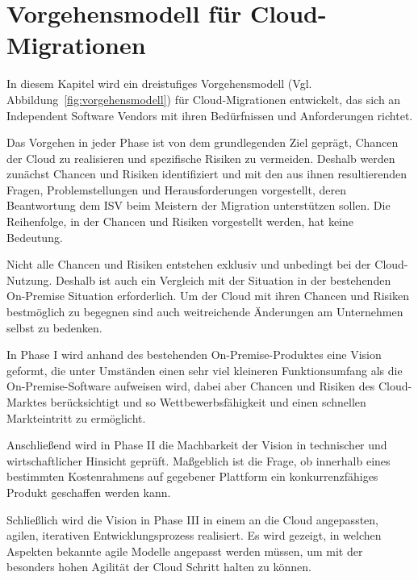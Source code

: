 \section{Vorgehensmodell für Cloud-Migrationen}
\label{cha:entwicklung_vorgehensmodell}
In diesem Kapitel wird ein dreistufiges Vorgehensmodell (Vgl. 
Abbildung~\ref{fig:vorgehensmodell}) für Cloud-Migrationen entwickelt, das sich 
an Independent Software Vendors mit ihren Bedürfnissen und Anforderungen 
richtet.

Das Vorgehen in jeder Phase ist von dem grundlegenden Ziel geprägt, Chancen der 
Cloud zu realisieren und spezifische Risiken zu vermeiden. Deshalb werden 
zunächst Chancen und Risiken identifiziert und mit den aus ihnen resultierenden 
Fragen, Problemstellungen und Herausforderungen vorgestellt, deren 
Beantwortung dem ISV beim Meistern der Migration unterstützen sollen. Die 
Reihenfolge, in der Chancen und Risiken vorgestellt werden, hat keine 
Bedeutung. 

Nicht alle Chancen und Risiken entstehen exklusiv und unbedingt 
bei der Cloud-Nutzung. Deshalb ist auch ein Vergleich mit der Situation in der 
bestehenden On-Premise Situation erforderlich. Um der Cloud mit ihren Chancen 
und Risiken bestmöglich zu begegnen sind auch weitreichende Änderungen am 
Unternehmen selbst zu bedenken.

In Phase I wird anhand des bestehenden On-Premise-Produktes eine Vision 
geformt, die unter Umständen einen sehr viel kleineren Funktionsumfang als die 
On-Premise-Software aufweisen wird, dabei aber Chancen und Risiken des 
Cloud-Marktes berücksichtigt und so Wettbewerbsfähigkeit und einen schnellen 
Markteintritt zu ermöglicht. 

Anschließend wird in Phase II die Machbarkeit der Vision in technischer und 
wirtschaftlicher Hinsicht geprüft. Maßgeblich ist die Frage, ob innerhalb 
eines bestimmten Kostenrahmens auf gegebener
Plattform ein konkurrenzfähiges Produkt geschaffen werden kann.

Schließlich wird die Vision in Phase III in einem an die Cloud 
angepassten, agilen, iterativen Entwicklungsprozess realisiert. Es wird 
gezeigt, in welchen Aspekten bekannte agile Modelle angepasst werden müssen, um 
mit der besonders hohen Agilität der Cloud Schritt halten zu können. 

